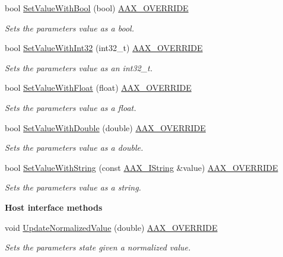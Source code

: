 \begin{Indent}
\begin{DoxyCompactItemize}
bool \mbox{\hyperlink{a01541_a9cd0c740db21f050c01efaab37afba54}{Set\+Value\+With\+Bool}} (bool) \mbox{\hyperlink{a00392_ac2f24a5172689ae684344abdcce55463}{A\+A\+X\+\_\+\+O\+V\+E\+R\+R\+I\+DE}}
\begin{DoxyCompactList}\small\item\em Sets the parameter\textquotesingle{}s value as a bool. \end{DoxyCompactList}\item 
bool \mbox{\hyperlink{a01541_a9656189927f1e6bc593e72dc9a3350ac}{Set\+Value\+With\+Int32}} (int32\+\_\+t) \mbox{\hyperlink{a00392_ac2f24a5172689ae684344abdcce55463}{A\+A\+X\+\_\+\+O\+V\+E\+R\+R\+I\+DE}}
\begin{DoxyCompactList}\small\item\em Sets the parameter\textquotesingle{}s value as an int32\+\_\+t. \end{DoxyCompactList}\item 
bool \mbox{\hyperlink{a01541_aa44752ab96e44c0be7f2c2f9d84f71a1}{Set\+Value\+With\+Float}} (float) \mbox{\hyperlink{a00392_ac2f24a5172689ae684344abdcce55463}{A\+A\+X\+\_\+\+O\+V\+E\+R\+R\+I\+DE}}
\begin{DoxyCompactList}\small\item\em Sets the parameter\textquotesingle{}s value as a float. \end{DoxyCompactList}\item 
bool \mbox{\hyperlink{a01541_a0f9948eaa3600905fbe07c07276f49cc}{Set\+Value\+With\+Double}} (double) \mbox{\hyperlink{a00392_ac2f24a5172689ae684344abdcce55463}{A\+A\+X\+\_\+\+O\+V\+E\+R\+R\+I\+DE}}
\begin{DoxyCompactList}\small\item\em Sets the parameter\textquotesingle{}s value as a double. \end{DoxyCompactList}\item 
bool \mbox{\hyperlink{a01541_a81fa9bfbd81d7b0f50f677e1a989b779}{Set\+Value\+With\+String}} (const \mbox{\hyperlink{a01873}{A\+A\+X\+\_\+\+I\+String}} \&value) \mbox{\hyperlink{a00392_ac2f24a5172689ae684344abdcce55463}{A\+A\+X\+\_\+\+O\+V\+E\+R\+R\+I\+DE}}
\begin{DoxyCompactList}\small\item\em Sets the parameter\textquotesingle{}s value as a string. \end{DoxyCompactList}\end{DoxyCompactItemize}
\end{Indent}
\begin{Indent}\textbf{ Host interface methods}\par
\begin{DoxyCompactItemize}
\item 
void \mbox{\hyperlink{a01541_a5710b949f27dbe2c3d81589983efc008}{Update\+Normalized\+Value}} (double) \mbox{\hyperlink{a00392_ac2f24a5172689ae684344abdcce55463}{A\+A\+X\+\_\+\+O\+V\+E\+R\+R\+I\+DE}}
\begin{DoxyCompactList}\small\item\em Sets the parameter\textquotesingle{}s state given a normalized value. \end{DoxyCompactList}\end{DoxyCompactItemize}
\end{Indent}
